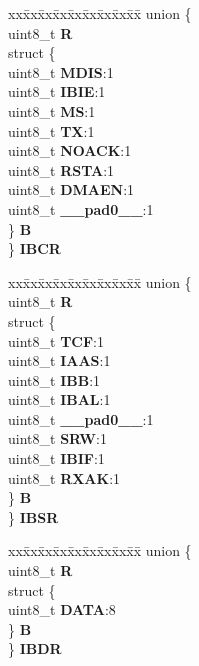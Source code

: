\begin{DoxyCompactItemize}
\begin{tabbing}
\end{tabbing}\item 
\mbox{\label{structI2C__tag_a9ea957cf4facd8da03d13b937550c7e9}} 
\begin{tabbing}
xx\=xx\=xx\=xx\=xx\=xx\=xx\=xx\=xx\=\kill
union \{\\
\>uint8\_t {\bfseries R}\\
\>struct \{\\
\>\>uint8\_t {\bfseries MDIS}:1\\
\>\>uint8\_t {\bfseries IBIE}:1\\
\>\>uint8\_t {\bfseries MS}:1\\
\>\>uint8\_t {\bfseries TX}:1\\
\>\>uint8\_t {\bfseries NOACK}:1\\
\>\>uint8\_t {\bfseries RSTA}:1\\
\>\>uint8\_t {\bfseries DMAEN}:1\\
\>\>uint8\_t {\bfseries \_\_pad0\_\_}:1\\
\>\} {\bfseries B}\\
\} {\bfseries IBCR}\\

\end{tabbing}\item 
\mbox{\label{structI2C__tag_a1dc9c8448f5bca0a8d8e932b631ca0d0}} 
\begin{tabbing}
xx\=xx\=xx\=xx\=xx\=xx\=xx\=xx\=xx\=\kill
union \{\\
\>uint8\_t {\bfseries R}\\
\>struct \{\\
\>\>uint8\_t {\bfseries TCF}:1\\
\>\>uint8\_t {\bfseries IAAS}:1\\
\>\>uint8\_t {\bfseries IBB}:1\\
\>\>uint8\_t {\bfseries IBAL}:1\\
\>\>uint8\_t {\bfseries \_\_pad0\_\_}:1\\
\>\>uint8\_t {\bfseries SRW}:1\\
\>\>uint8\_t {\bfseries IBIF}:1\\
\>\>uint8\_t {\bfseries RXAK}:1\\
\>\} {\bfseries B}\\
\} {\bfseries IBSR}\\

\end{tabbing}\item 
\mbox{\label{structI2C__tag_ad2266017f0918b86e8dcb27a7e0174b7}} 
\begin{tabbing}
xx\=xx\=xx\=xx\=xx\=xx\=xx\=xx\=xx\=\kill
union \{\\
\>uint8\_t {\bfseries R}\\
\>struct \{\\
\>\>uint8\_t {\bfseries DATA}:8\\
\>\} {\bfseries B}\\
\} {\bfseries IBDR}\\


\end{tabbing}
\end{DoxyCompactItemize}
